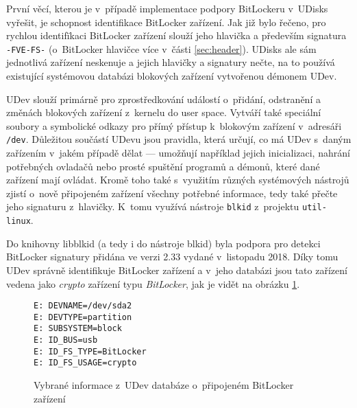 \label{sec:bitlocker-identification}

První věcí, kterou je v~případě implementace podpory BitLockeru v~UDisks vyřešit, je schopnost identifikace BitLocker zařízení. Jak již bylo řečeno, pro rychlou identifïkaci BitLocker zařízení slouží jeho hlavička a především signatura \texttt{-FVE-FS-} (o~BitLocker hlavičce více v~části \ref{sec:header}). UDisks ale sám jednotlivá zařízení neskenuje a jejich hlavičky a signatury nečte, na to používá existující systémovou databázi blokových zařízení vytvořenou démonem UDev.

UDev slouží primárně pro zprostředkování událostí o~přidání, odstranění a změnách blokových zařízení z~kernelu do user space. Vytváří také speciální soubory a symbolické odkazy pro přímý přístup k~blokovým zařízení v~adresáři \texttt{/dev}. Důležitou součástí UDevu jsou pravidla, která určují, co má UDev s~daným zařízením v~jakém případě dělat --- umožňují například jejich inicializaci, nahrání potřebných ovladačů nebo prosté spuštění programů a démonů, které dané zařízení mají ovládat.\cite{Kenlon2018} Kromě toho také s~využitím různých systémových nástrojů zjistí o~nově připojeném zařízení všechny potřebné informace, tedy také přečte jeho signaturu z~hlavičky. K~tomu využívá nástroje \texttt{blkid} z~projektu \texttt{util-linux}.

Do knihovny libblkid (a tedy i do nástroje blkid) byla podpora pro detekci BitLocker signatury přidána ve verzi 2.33 vydané v~listopadu 2018\cite{Zak2018}. Díky tomu UDev správně identifikuje BitLocker zařízení a v~jeho databázi jsou tato zařízení vedena jako \emph{crypto} zařízení typu \emph{BitLocker}, jak je vidět na obrázku \ref{fig:udev-bitlocker}.

\begin{figure}[h]
		\centering
		\captionsetup{width=0.65\linewidth}
\begin{center}
\centering
\begin{lstlisting}[frame=none, basicstyle=\ttfamily\small, columns=fullflexible, keepspaces=true, xleftmargin=.35\textwidth, xrightmargin=.35\textwidth]
E: DEVNAME=/dev/sda2
E: DEVTYPE=partition
E: SUBSYSTEM=block
E: ID_BUS=usb
E: ID_FS_TYPE=BitLocker
E: ID_FS_USAGE=crypto
\end{lstlisting}
\end{center}
		\caption{Vybrané informace z~UDev databáze o~připojeném BitLocker zařízení}
		\label{fig:udev-bitlocker}
\end{figure}

